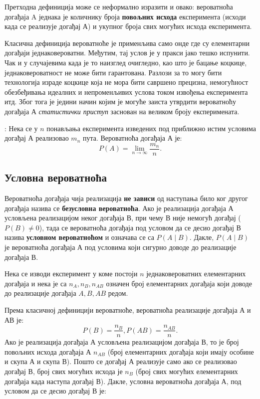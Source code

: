 Претходна дефиниција може се неформално изразити и овако: вероватноћа догађаја A једнака је количнику броја \textbf{повољних исхода} експеримента (исходи када се реализује догађај А) и укупног броја свих могућих исхода експеримента.

Класична дефиниција вероватноће је применљива само онде где су елементарни догађаји једнаковероватни. Међутим, тај услов је у пракси јако тешко испунити. Чак и у случајевима када је то наизглед очигледно, као што је бацање коцкице, једнаковероватност не може бити гарантована.  Разлози за то могу бити технологија израде коцкице која не мора бити савршено прецизна, немогућност обезбеђивања идеалних и непроменљивих услова током извођења експеримента итд. Због тога је једини начин којим је могуће заиста утврдити вероватноћу догађаја А \textit{статистички приступ} заснован на великом броју експеримената.


\begin{de}
 : 
Нека се  у $n$ понављања експеримента изведених под приближно истим условима догађај А реализовао ${m_n}$ пута. Вероватноћа догађаја А је:
\begin{equation}
 P(A) = \lim_{n\to\infty}\frac{m_n}{n}.
\end{equation}
\end{de}

\subsection{Условна вероватноћа}

Вероватноћа догађаја чија реализација \textbf{не зависи} од наступања било ког другог догађаја назива се \textbf{безусловна вероватноћа}. Ако је реализација догађаја А условљена реализацијом неког догађаја В, при чему В није немогућ догађај ($ P(B) \neq 0 $), тада се вероватноћа догађаја под условом да се десио догађај В назива \textbf{условном вероватноћом} и означава се са 
$ P(A \mid B )$. Дакле, $ P(A \mid B )$ је вероватноћа догађаја А под условима који сигурно доводе до реализације догађаја В.

Нека се изводи експеримент у коме постоји $n$ једнаковероватних елементарних догађаја и нека је са $n_A,n_B,n_{AB}$ означен број елементарних догађаја који доводе до реализације догађаја $A, B ,AB$ редом. 

Према класичној дефиницији вероватноће, вероватноћа реализације догађаја А и АВ је:
\begin{equation}
P(B) = \frac{n_B}{n}, P(AB) = \frac{n_{AB}}{n}.
\end{equation}
Ако је реализација догађаја А условљена реализацијом догађаја В, то је број повољних исхода догађаја А $n_{AB}$ (број елементарних догађаја који имају особине и скупа А и скупа В). Пошто се догађај А реализује само ако се реализовао догађај В, број свих могућих исхода је $n_B$ (број свих могућих елементарних догађаја када наступа догађај В). Дакле, условна вероватноћа догађаја А, под условом да се десио догађај В је:

